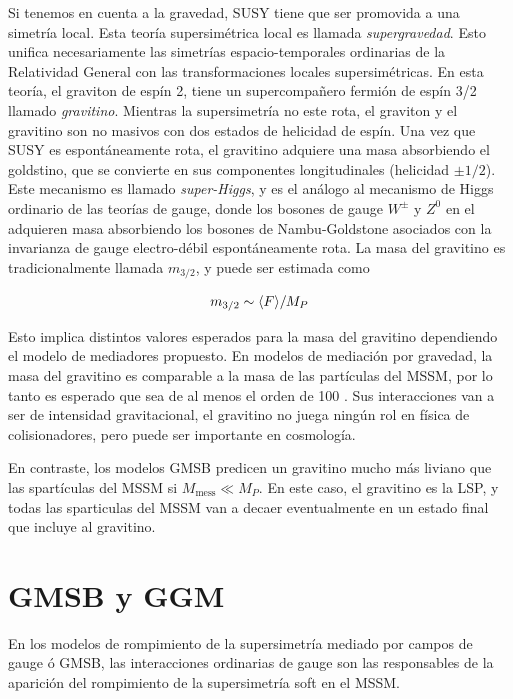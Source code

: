 Si tenemos en cuenta a la gravedad, SUSY tiene que ser promovida a una
simetría local. Esta teoría supersimétrica local es llamada
\emph{supergravedad}. Esto unifica necesariamente las simetrías
espacio-temporales ordinarias de la Relatividad General con las
transformaciones locales supersimétricas. En esta teoría, el graviton
de espín 2, tiene un supercompa\~nero fermión de espín 3/2 llamado
\emph{gravitino}. Mientras la supersimetría no este rota, el graviton
y el gravitino son no masivos con dos estados de helicidad de espín.
Una vez que SUSY es espontáneamente rota, el gravitino adquiere una
masa absorbiendo el goldstino, que se convierte en sus componentes
longitudinales (helicidad $\pm 1/2$). Este mecanismo es llamado
\emph{super-Higgs}, y es el análogo al mecanismo de Higgs ordinario de
las teorías de gauge, donde los bosones de gauge $W^\pm$ y $Z^0$ en el
{\SM} adquieren masa absorbiendo los bosones de Nambu-Goldstone
asociados con la invarianza de gauge electro-débil espontáneamente
rota. La masa del gravitino es tradicionalmente llamada $m_{3/2}$, y
puede ser estimada como

\begin{equation}
  m_{3/2} \sim \langle F \rangle / M_P
\end{equation}

Esto implica distintos valores esperados para la masa del gravitino
dependiendo el modelo de mediadores propuesto. En modelos de mediación
por gravedad, la masa del gravitino es comparable a la masa de las
partículas del MSSM, por lo tanto es esperado que sea de al menos el
orden de 100 \gev. Sus interacciones van a ser de intensidad
gravitacional, el gravitino no juega ningún rol en física de
colisionadores, pero puede ser importante en cosmología.

En contraste, los modelos GMSB predicen un gravitino mucho más liviano
que las spartículas del MSSM si $M_\text{mess} \ll M_P$. En este caso,
el gravitino es la LSP, y todas las sparticulas del MSSM van a decaer
eventualmente en un estado final que incluye al gravitino.



\section{GMSB y GGM} %

En los modelos de rompimiento de la supersimetría mediado por campos
de gauge ó GMSB, las interacciones ordinarias de gauge son las
responsables de la aparición del rompimiento de la supersimetría soft
en el MSSM.

